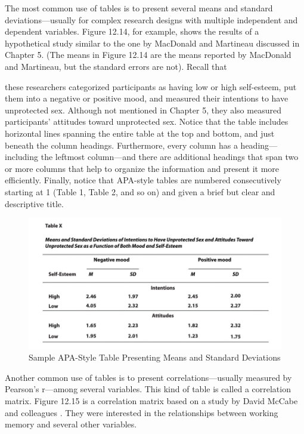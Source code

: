 The most common use of tables is to present several means and standard deviations---usually for complex research designs with multiple independent and dependent variables. Figure 12.14, for example, shows the results of a hypothetical study similar to the one by MacDonald and Martineau \citeyear{macdonald_self-esteem_2002} discussed in Chapter 5. (The means in Figure 12.14 are the means reported by MacDonald and Martineau, but the standard errors are not). Recall that

these researchers categorized participants as having low or high self-esteem, put them into a negative or positive mood, and measured their intentions to have unprotected sex. Although not mentioned in Chapter 5, they also measured participants' attitudes toward unprotected sex. Notice that the table includes horizontal lines spanning the entire table at the top and bottom, and just beneath the column headings. Furthermore, every column has a heading---including the leftmost column---and there are additional headings that span two or more columns that help to organize the information and present it more efficiently. Finally, notice that APA-style tables are numbered consecutively starting at 1 (Table 1, Table 2, and so on) and given a brief but clear and descriptive title.


\begin{figure}
\includegraphics[width=\linewidth]{figures/Fig12-14}
\caption{Sample APA-Style Table Presenting Means and Standard Deviations}
\label{fig:apatable}
\end{figure}


Another common use of tables is to present correlations---usually measured by Pearson's r---among several variables. This kind of table is called a correlation matrix. Figure 12.15 is a correlation matrix based on a study by David McCabe and colleagues \citep{mccabe_relationship_2010}. They were interested in the relationships between working memory and several other variables.

